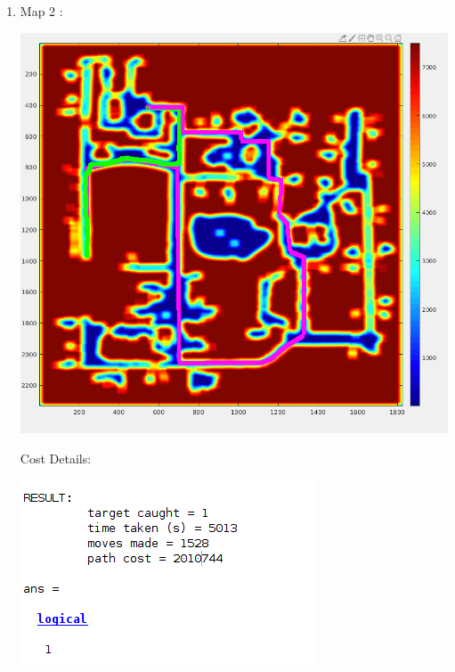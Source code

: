 \documentclass[12pt]{article}
\begin{document}
\begin{enumerate}
    \item Map 2 : 
    \begin{center}
    \includegraphics[scale = 0.4]{16782_HW1_fall19_v2/pictures/map2.png} \\
    \end{center}
    
    Cost Details:
    \begin{center}
    \includegraphics[scale = 0.6]{16782_HW1_fall19_v2/pictures/map2_cost.png} \\
    \end{center}
    
    \pagebreak
    

\end{enumerate}
\end{document}
